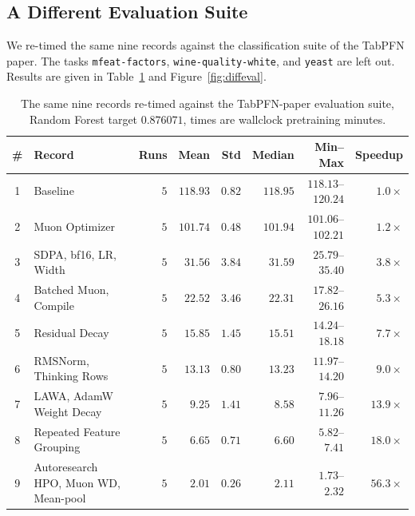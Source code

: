 \documentclass{article}
\theoremstyle{plain}
\theoremstyle{definition}
\theoremstyle{remark}
\begin{document}
\subsection{A Different Evaluation Suite}
\label{app:robustness-diffeval}
We re-timed the same nine records against the classification suite of the TabPFN paper.
The tasks \texttt{mfeat-factors}, \texttt{wine-quality-white}, and \texttt{yeast} are left out.
Results are given in Table~\ref{tab:diffeval} and Figure~\ref{fig:diffeval}.
\begin{table}[h]
\centering
\small
\caption{The same nine records re-timed against the TabPFN-paper evaluation suite, Random Forest target $0.876071$, times are wallclock pretraining minutes.}
\label{tab:diffeval}
\begin{tabular}{@{}clrrrrrr@{}}
  \toprule
  \# & Record & Runs & Mean & Std & Median & Min--Max & Speedup \\
  \midrule
  1 & Baseline & $5$ & $118.93$ & $0.82$ & $118.95$ & $118.13$--$120.24$ & $1.0\times$ \\
  2 & Muon Optimizer & $5$ & $101.74$ & $0.48$ & $101.94$ & $101.06$--$102.21$ & $1.2\times$ \\
  3 & SDPA, bf16, LR, Width & $5$ & $\phantom{0}31.56$ & $3.84$ & $\phantom{0}31.59$ & $\phantom{0}25.79$--$\phantom{0}35.40$ & $3.8\times$ \\
  4 & Batched Muon, Compile & $5$ & $\phantom{0}22.52$ & $3.46$ & $\phantom{0}22.31$ & $\phantom{0}17.82$--$\phantom{0}26.16$ & $5.3\times$ \\
  5 & Residual Decay & $5$ & $\phantom{0}15.85$ & $1.45$ & $\phantom{0}15.51$ & $\phantom{0}14.24$--$\phantom{0}18.18$ & $7.7\times$ \\
  6 & RMSNorm, Thinking Rows & $5$ & $\phantom{0}13.13$ & $0.80$ & $\phantom{0}13.23$ & $\phantom{0}11.97$--$\phantom{0}14.20$ & $9.0\times$ \\
  7 & LAWA, AdamW Weight Decay & $5$ & $\phantom{00}9.25$ & $1.41$ & $\phantom{00}8.58$ & $\phantom{00}7.96$--$\phantom{0}11.26$ & $13.9\times$ \\
  8 & Repeated Feature Grouping & $5$ & $\phantom{00}6.65$ & $0.71$ & $\phantom{00}6.60$ & $\phantom{00}5.82$--$\phantom{00}7.41$ & $18.0\times$ \\
  9 & Autoresearch HPO, Muon WD, Mean-pool & $5$ & $\phantom{00}2.01$ & $0.26$ & $\phantom{00}2.11$ & $\phantom{00}1.73$--$\phantom{00}2.32$ & $56.3\times$ \\
  \bottomrule
\end{tabular}
\end{table}
\end{document}
